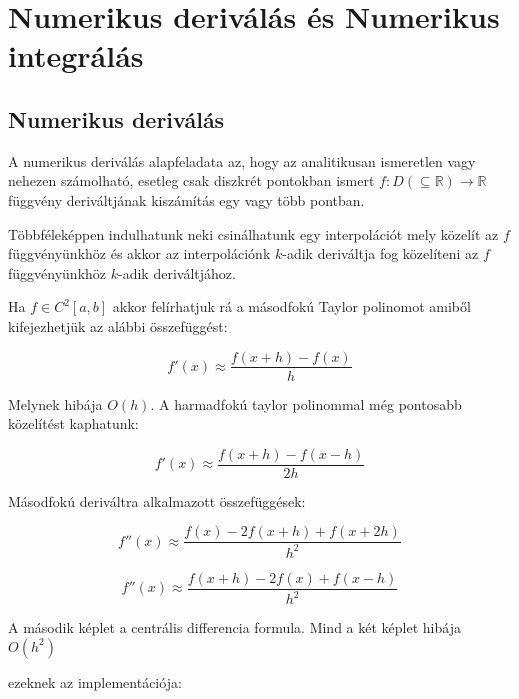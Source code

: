     
    \section{Numerikus deriválás és Numerikus
integrálás}\label{numerikus-derivuxe1luxe1s-uxe9s-numerikus-integruxe1luxe1s}

    \subsection{Numerikus deriválás}\label{numerikus-derivuxe1luxe1s}

    A numerikus deriválás alapfeladata az, hogy az analitikusan ismeretlen
vagy nehezen számolható, esetleg csak diszkrét pontokban ismert
\(f:D(\subseteq \mathbb{R})\rightarrow \mathbb{R}\) függvény
deriváltjának kiszámítás egy vagy több pontban.

Többféleképpen indulhatunk neki csinálhatunk egy interpolációt mely
közelít az \(f\) függvényünkhöz és akkor az interpolációnk \(k\)-adik
deriváltja fog közelíteni az \(f\) függvényünkhöz \(k\)-adik
deriváltjához.

Ha \(f \in C^2[a,b]\) akkor felírhatjuk rá a másodfokú Taylor polinomot
amiből kifejezhetjük az alábbi összefüggést:

\[
f'(x)\approx \frac{f(x+h)-f(x)}{h}
\]

Melynek hibája \(O(h)\). A harmadfokú taylor polinommal még pontosabb
közelítést kaphatunk:

\[
f'(x)\approx \frac{f(x+h)-f(x-h)}{2h}
\]

Másodfokú deriváltra alkalmazott összefüggések:

\[
f''(x)\approx \frac{f(x)-2f(x+h)+f(x+2h)}{h^2}
\]

\[
f''(x)\approx \frac{f(x+h)-2f(x)+f(x-h)}{h^2}
\]

A második képlet a centrális differencia formula. Mind a két képlet
hibája \(O(h^2)\)

ezeknek az implementációja:

\begin{python}

\end{python}

    \begin{center}
    \end{center}
    { \hspace*{\fill} \\}
    
